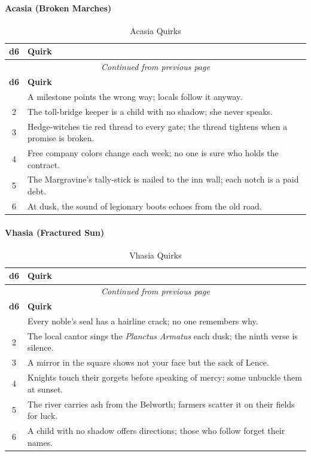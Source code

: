 \paragraph{Acasia (Broken Marches)}
\begin{center}
\begin{longtable}{cl}
\caption{Acasia Quirks}\\
\toprule
\textbf{d6} & \textbf{Quirk} \\
\midrule
\endfirsthead
\multicolumn{2}{c}{\emph{Continued from previous page}} \\
\toprule
\textbf{d6} & \textbf{Quirk} \\
\midrule
\endhead
\bottomrule
\endfoot
1 & A milestone points the wrong way; locals follow it anyway. \\
2 & The toll-bridge keeper is a child with no shadow; she never speaks. \\
3 & Hedge-witches tie red thread to every gate; the thread tightens when a promise is broken. \\
4 & Free company colors change each week; no one is sure who holds the contract. \\
5 & The Margravine's tally-stick is nailed to the inn wall; each notch is a paid debt. \\
6 & At dusk, the sound of legionary boots echoes from the old road. \\
\end{longtable}
\end{center}

\paragraph{Vhasia (Fractured Sun)}
\begin{center}
\begin{longtable}{cl}
\caption{Vhasia Quirks}\\
\toprule
\textbf{d6} & \textbf{Quirk} \\
\midrule
\endfirsthead
\multicolumn{2}{c}{\emph{Continued from previous page}} \\
\toprule
\textbf{d6} & \textbf{Quirk} \\
\midrule
\endhead
\bottomrule
\endfoot
1 & Every noble's seal has a hairline crack; no one remembers why. \\
2 & The local cantor sings the \emph{Planctus Armatus} each dusk; the ninth verse is silence. \\
3 & A mirror in the square shows not your face but the sack of Lence. \\
4 & Knights touch their gorgets before speaking of mercy; some unbuckle them at sunset. \\
5 & The river carries ash from the Belworth; farmers scatter it on their fields for luck. \\
6 & A child with no shadow offers directions; those who follow forget their names. \\
\end{longtable}
\end{center}

